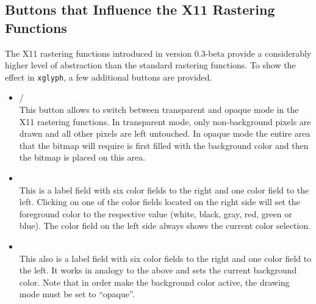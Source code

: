 \subsection{Buttons that Influence the X11 Rastering Functions}
The X11 rastering functions introduced in version 0.3-beta provide a
considerably higher level of abstraction than the standard rastering
functions. To show the effect in \verb+xglyph+, a few additional buttons are
provided.  
\begin{itemize}
\item {}/\\ 
  This button allows to switch between transparent and opaque mode in the X11
  rastering functions. In transparent mode, only non-background pixels are
  drawn and all other pixels are left untouched. In opaque mode the entire
  area that the bitmap will require is first filled with the background color
  and then the bitmap is placed on this area.
\item {}\\
  This is a label field with six color fields to the right and one color field
  to the left. Clicking on one of the color fields located on the right side
  will set the foreground color to the respective value (white, black, gray,
  red, green or blue). The color field on the left side always shows the
  current color selection. 
\item {}\\
  This also is a label field with six color fields to the right and one color
  field to the left. It works in analogy to the above and sets the current
  background color. Note that in order make the background color active, the
  drawing mode must be set to ``opaque''.
\end{itemize}

